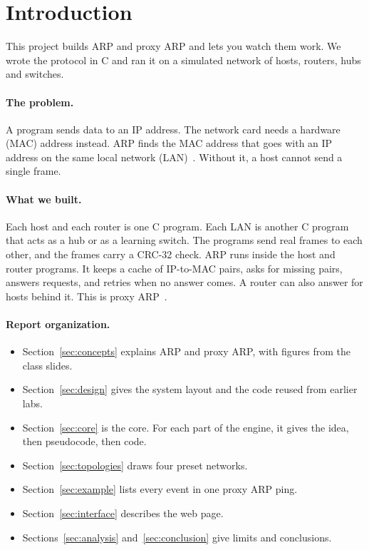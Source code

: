 \section{Introduction}\label{sec:intro}

This project builds ARP and proxy ARP and lets you watch them work. We wrote the protocol in C and ran it on a simulated network of hosts, routers, hubs and switches.

\paragraph{The problem.} A program sends data to an IP address. The network card needs a hardware (MAC) address instead. ARP finds the MAC address that goes with an IP address on the same local network (LAN)~\cite{rfc826,forouzan}. Without it, a host cannot send a single frame.

\paragraph{What we built.} Each host and each router is one C program. Each LAN is another C program that acts as a hub or as a learning switch. The programs send real frames to each other, and the frames carry a CRC-32 check. ARP runs inside the host and router programs. It keeps a cache of IP-to-MAC pairs, asks for missing pairs, answers requests, and retries when no answer comes. A router can also answer for hosts behind it. This is proxy ARP~\cite{topic14}.

\paragraph{Report organization.}
\begin{itemize}[nosep]
  \item Section~\ref{sec:concepts} explains ARP and proxy ARP, with figures from the class slides.
  \item Section~\ref{sec:design} gives the system layout and the code reused from earlier labs.
  \item Section~\ref{sec:core} is the core. For each part of the engine, it gives the idea, then pseudocode, then code.
  \item Section~\ref{sec:topologies} draws four preset networks.
  \item Section~\ref{sec:example} lists every event in one proxy ARP ping.
  \item Section~\ref{sec:interface} describes the web page.
  \item Sections~\ref{sec:analysis} and~\ref{sec:conclusion} give limits and conclusions.
\end{itemize}
